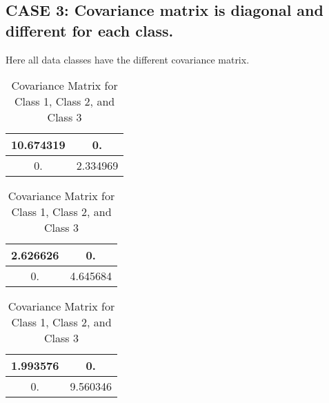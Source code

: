 \subsection{CASE 3: Covariance matrix is diagonal and different for each class.}
Here all data classes have the different covariance matrix.\\

\begin{table}[H]
    \begin{minipage}{0.37\textwidth}
        \centering
    
        \begin{tabular}{|c|c|}
        \hline
        10.674319 & 0. \\
        \hline 
        0. & 2.334969 \\
        \hline
        \end{tabular}
    \end{minipage}%
    \begin{minipage}{0.37\textwidth}
        \begin{tabular}{|c|c|}
        \hline
        2.626626 & 0. \\
        \hline 
        0. & 4.645684 \\
        \hline
        \end{tabular}
    \end{minipage}%
    \begin{minipage}{0.37\textwidth}
        \begin{tabular}{|c|c|}
        \hline
        1.993576 & 0. \\
        \hline 
        0. & 9.560346 \\
        \hline
        \end{tabular}
    \end{minipage}
\caption{Covariance Matrix for Class 1, Class 2, and Class 3}
\label{tab:Table10}
\end{table}

